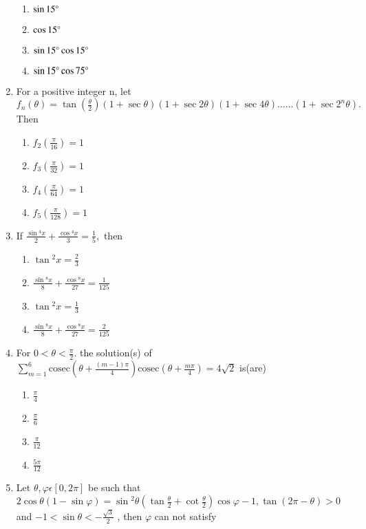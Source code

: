 \begin{enumerate}[label=\arabic*.,ref=\thesubsection.\theenumi]
\begin{enumerate}
        \item $\sin{15\degree}$
        \item $\cos{15\degree}$
        \item $\sin{15\degree}\cos{15\degree}$
        \item $\sin{15\degree}\cos{75\degree}$
    \end{enumerate}
    \item For a positive integer n, let $f_n(\theta) =\tan{ (\frac{\theta}{2})}(1 +\sec{\theta})(1+\sec{2\theta})(1+\sec{4\theta})......(1+\sec{2^n\theta}).$Then
    \begin{enumerate}
        \item $f_2(\frac{\pi}{16})= 1$
        \item $f_3(\frac{\pi}{32})= 1$
        \item $f_4(\frac{\pi}{64})= 1$
        \item $f_5(\frac{\pi}{128})= 1$
    \end{enumerate}
    \item If $\frac{\sin{^4x}}{2} + \frac{\cos{^4x}}{3} =\frac{1}{5},$ then
    \begin{enumerate}
        \item $\tan{^2x}=\frac{2}{3}$
        \item $\frac{\sin{^8x}}{8}+\frac{\cos{^8x}}{27}=\frac{1}{125}$
        \item $\tan{^2x}=\frac{1}{3}$
        \item $\frac{\sin{^8x}}{8}+\frac{\cos{^8x}}{27}=\frac{2}{125}$
    \end{enumerate}
    \item For $0<\theta<\frac{\pi}{2}.$ the solution(s) of 
    $\sum_{m=1}^{6}\mathrm{cosec}(\theta+\frac{(m-1)\pi}{4})\mathrm{cosec}(\theta+\frac{m\pi}{4}) = 4\sqrt{2}$ is(are)
    \begin{enumerate}
        \item $\frac{\pi}{4}$
        \item $\frac{\pi}{6}$
        \item $\frac{\pi}{12}$
        \item $\frac{5\pi}{12}$
    \end{enumerate}
    \item Let $\theta,\varphi \epsilon[0,2\pi]$ be such that $2 \cos{\theta}(1-\sin{\varphi}) = \sin{^2\theta}(\tan{\frac{\theta}{2}}+\cot{\frac{\theta}{2}})\cos{\varphi -1} , \tan{(2\pi-\theta)} > 0$ and $-1<\sin{\theta} < -\frac{\sqrt3}{2}$ , then $\varphi$  can not satisfy
    \begin{enumerate}

\end{enumerate}
\end{enumerate}
